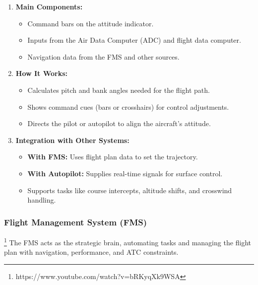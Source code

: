 \documentclass[math,code]{amznotes}
\theoremstyle{remark}
\begin{document}
\begin{enumerate}
    \item \textbf{Main Components:}
    \begin{itemize}
        \item Command bars on the attitude indicator.
        \item Inputs from the Air Data Computer (ADC) and flight data computer.
        \item Navigation data from the FMS and other sources.
    \end{itemize}
    
    \item \textbf{How It Works:}
    \begin{itemize}
        \item Calculates pitch and bank angles needed for the flight path.
        \item Shows command cues (bars or crosshairs) for control adjustments.
        \item Directs the pilot or autopilot to align the aircraft’s attitude.
    \end{itemize}
    
    \item \textbf{Integration with Other Systems:}
    \begin{itemize}
        \item \textbf{With FMS:} Uses flight plan data to set the trajectory.
        \item \textbf{With Autopilot:} Supplies real-time signals for surface control.
        \item Supports tasks like course intercepts, altitude shifts, and crosswind handling.
    \end{itemize}
\end{enumerate}

\subsubsection{Flight Management System (FMS)}\footnote{https://www.youtube.com/watch?v=bRKyqXk9WSA}
The FMS acts as the strategic brain, automating tasks and managing the flight plan with navigation, performance, and ATC constraints.
\end{document}
